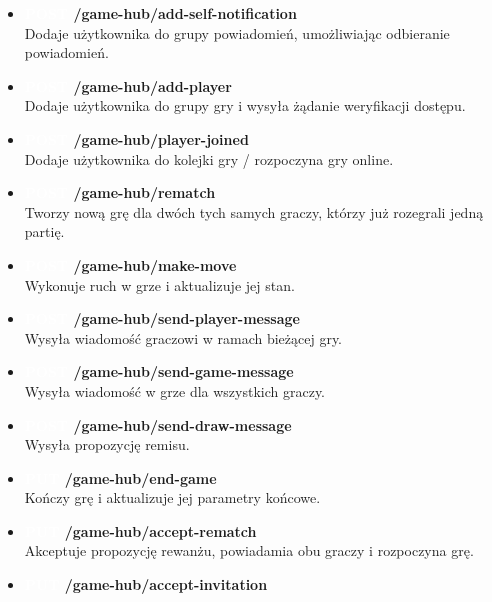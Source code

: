 \documentclass[12pt,a4paper]{article}
\begin{document}
\newpage

\begin{itemize}
    \setlength\itemsep{0.1cm}
    \item \textbf{\colorbox{green!90}{\textcolor{white}{POST}} /game-hub/add-self-notification}\\
    Dodaje użytkownika do grupy powiadomień, umożliwiając odbieranie powiadomień.
    \item \textbf{\colorbox{green!90}{\textcolor{white}{POST}} /game-hub/add-player}\\
    Dodaje użytkownika do grupy gry i wysyła żądanie weryfikacji dostępu.
    \item \textbf{\colorbox{green!90}{\textcolor{white}{POST}} /game-hub/player-joined}\\
    Dodaje użytkownika do kolejki gry / rozpoczyna gry online.
    \item \textbf{\colorbox{green!90}{\textcolor{white}{POST}} /game-hub/rematch}\\
    Tworzy nową grę dla dwóch tych samych graczy, którzy już rozegrali jedną partię.
    \item \textbf{\colorbox{green!90}{\textcolor{white}{POST}} /game-hub/make-move}\\
    Wykonuje ruch w grze i aktualizuje jej stan.
    \item \textbf{\colorbox{green!90}{\textcolor{white}{POST}} /game-hub/send-player-message}\\
    Wysyła wiadomość graczowi w ramach bieżącej gry.
    \item \textbf{\colorbox{green!90}{\textcolor{white}{POST}} /game-hub/send-game-message}\\
    Wysyła wiadomość w grze dla wszystkich graczy.
    \item \textbf{\colorbox{green!90}{\textcolor{white}{POST}} /game-hub/send-draw-message}\\
    Wysyła propozycję remisu.
    \item \textbf{\colorbox{orange!90}{\textcolor{white}{PUT}} /game-hub/end-game}\\
    Kończy grę i aktualizuje jej parametry końcowe.
    \item \textbf{\colorbox{orange!90}{\textcolor{white}{PUT}} /game-hub/accept-rematch}\\
    Akceptuje propozycję rewanżu, powiadamia obu graczy i rozpoczyna grę.
    \item \textbf{\colorbox{orange!90}{\textcolor{white}{PUT}} /game-hub/accept-invitation}\\

\end{itemize}
\end{document}
